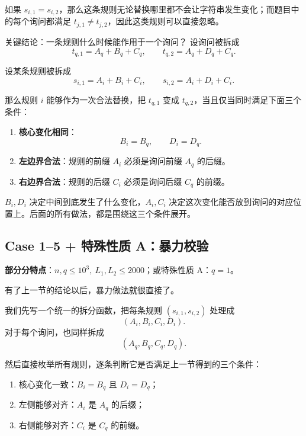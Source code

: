 \documentclass{book}
\begin{document}
如果 $s_{i,1}=s_{i,2}$，那么这条规则无论替换哪里都不会让字符串发生变化；而题目中的每个询问都满足 $t_{j,1}\ne t_{j,2}$，因此这类规则可以直接忽略。
\begin{keybox}{关键结论：一条规则什么时候能作用于一个询问？}
设询问被拆成
\[
t_{q,1}=A_q+B_q+C_q,\qquad t_{q,2}=A_q+D_q+C_q.
\]

设某条规则被拆成
\[
s_{i,1}=A_i+B_i+C_i,\qquad s_{i,2}=A_i+D_i+C_i.
\]

那么规则 $i$ 能够作为一次合法替换，把 $t_{q,1}$ 变成 $t_{q,2}$，当且仅当同时满足下面三个条件：

\begin{enumerate}[itemsep=1pt, topsep=2pt, parsep=0pt, partopsep=0pt]
    \item \textbf{核心变化相同}：
    \[
    B_i=B_q,\qquad D_i=D_q.
    \]

    \item \textbf{左边界合法}：规则的前缀 $A_i$ 必须是询问前缀 $A_q$ 的后缀。

    \item \textbf{右边界合法}：规则的后缀 $C_i$ 必须是询问后缀 $C_q$ 的前缀。
\end{enumerate}
\end{keybox}

$B_i,D_i$ 决定中间到底发生了什么变化，$A_i,C_i$ 决定这次变化能否放到询问的对应位置上。后面的所有做法，都是围绕这三个条件展开。

\subsection{Case 1--5 + 特殊性质 A：暴力校验}

\textbf{部分分特点}：$n,q \le 10^3,\ L_1,L_2 \le 2000$；或特殊性质 A：$q=1$。

有了上一节的结论以后，暴力做法就很直接了。

我们先写一个统一的拆分函数，把每条规则 $(s_{i,1},s_{i,2})$ 处理成
\[
(A_i,B_i,C_i,D_i).
\]
对于每个询问，也同样拆成
\[
(A_q,B_q,C_q,D_q).
\]

然后直接枚举所有规则，逐条判断它是否满足上一节得到的三个条件：

\begin{enumerate}[leftmargin=2em,itemsep=1pt,topsep=2pt,parsep=0pt,partopsep=0pt]
    \item 核心变化一致：$B_i=B_q$ 且 $D_i=D_q$；
    \item 左侧能够对齐：$A_i$ 是 $A_q$ 的后缀；
    \item 右侧能够对齐：$C_i$ 是 $C_q$ 的前缀。
\end{enumerate}
\end{document}
